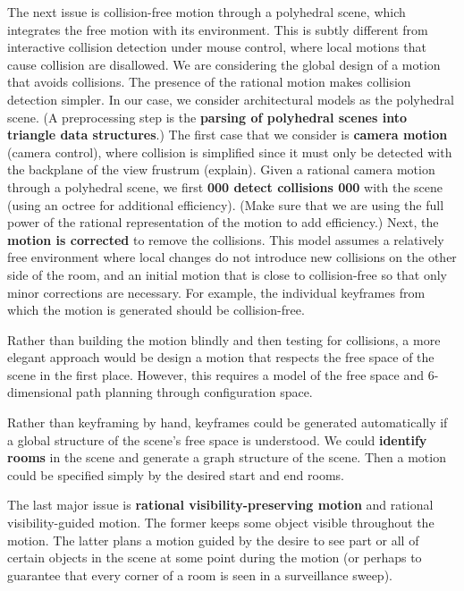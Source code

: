 \documentclass[12pt]{article}
\begin{document}
The next issue is collision-free motion through a polyhedral scene,
which integrates the free motion with its environment.
This is subtly different from interactive collision detection under mouse control,
where local motions that cause collision are disallowed.
We are considering the global design of a motion that avoids collisions.
The presence of the rational motion makes collision detection simpler.
In our case, we consider architectural models as the polyhedral scene.
(A preprocessing step is the {\bf parsing of polyhedral scenes into triangle data structures}.)
The first case that we consider is {\bf camera motion} (camera control),
where collision is simplified since it must only be detected with the backplane of the 
view frustrum (explain).
Given a rational camera motion through a polyhedral scene,
we first {\large {\bf 000 detect collisions 000}} with the scene (using an octree for additional efficiency).
(Make sure that we are using the full power of the rational representation of the motion
to add efficiency.)
Next, the {\bf motion is corrected} to remove the collisions.
This model assumes a relatively free environment where local changes do not introduce 
new collisions on the other side of the room, and an initial motion that is close to 
collision-free so that only minor corrections are necessary.
For example, the individual keyframes from which the motion is generated should be collision-free.

Rather than building the motion blindly and then testing for collisions,
a more elegant approach would be design a motion that respects the free space of the scene
in the first place.
However, this requires a model of the free space and 6-dimensional path planning through
configuration space.

Rather than keyframing by hand, keyframes could be generated automatically if a global structure
of the scene's free space is understood.
We could {\bf identify rooms} in the scene and generate a graph structure of the scene.
Then a motion could be specified simply by the desired start and end rooms.

The last major issue is {\bf rational visibility-preserving motion} and
rational visibility-guided motion.
The former keeps some object visible throughout the motion.
The latter plans a motion guided by the desire to see part or all of certain objects in the scene
at some point during the motion (or perhaps to guarantee that every corner of a room is seen 
in a surveillance sweep).
\end{document}
